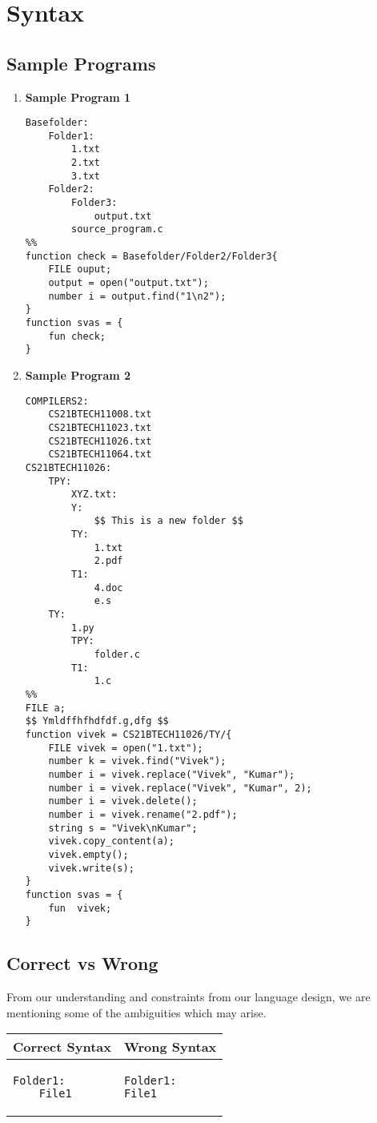 \documentclass{article}
\begin{document}
\section{Syntax}
\subsection{Sample Programs}
\begin{enumerate}
\item \textbf{Sample Program 1}
\begin{verbatim}
Basefolder:
    Folder1:
        1.txt
        2.txt
        3.txt
    Folder2:
        Folder3:
            output.txt
        source_program.c
%%
function check = Basefolder/Folder2/Folder3{
    FILE ouput;
    output = open("output.txt");
    number i = output.find("1\n2");
}
function svas = {
    fun check;
}
\end{verbatim}
\item \textbf{Sample Program 2}
\begin{verbatim}
COMPILERS2:
    CS21BTECH11008.txt
    CS21BTECH11023.txt
    CS21BTECH11026.txt
    CS21BTECH11064.txt
CS21BTECH11026:
    TPY:
        XYZ.txt:
        Y:
            $$ This is a new folder $$
        TY:
            1.txt
            2.pdf
        T1:
            4.doc
            e.s
    TY:
        1.py
        TPY:
            folder.c
        T1:
            1.c
%%
FILE a;
$$ Ymldffhfhdfdf.g,dfg $$
function vivek = CS21BTECH11026/TY/{
    FILE vivek = open("1.txt");
    number k = vivek.find("Vivek");
    number i = vivek.replace("Vivek", "Kumar");
    number i = vivek.replace("Vivek", "Kumar", 2);
    number i = vivek.delete();
    number i = vivek.rename("2.pdf");
    string s = "Vivek\nKumar";
    vivek.copy_content(a);
    vivek.empty();
    vivek.write(s);
}
function svas = {
    fun  vivek;
}
\end{verbatim}

\end{enumerate}

\subsection{Correct vs Wrong}
From our understanding and constraints from our language design, we are mentioning some of the ambiguities which may arise.
\begin{table}[h]
\centering
\begin{tabular}{|p{}|p{}|}
\hline
\textbf{Correct Syntax} & \textbf{Wrong Syntax} \\
\hline
\begin{verbatim}
Folder1:
    File1
\end{verbatim}
&
\begin{verbatim}
Folder1:
File1
\end{verbatim}
\\
\hline
\end{tabular}
\end{table}
\end{document}
